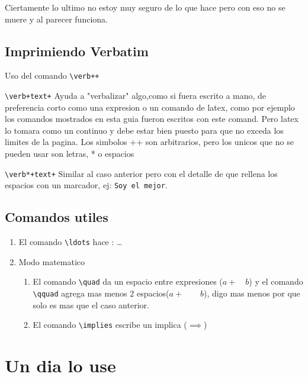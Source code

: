 \documentclass[letter,10pt]{article}
\begin{document}
Ciertamente lo ultimo no estoy muy seguro de lo que hace pero con eso no se muere y al parecer funciona.
\subsection{Imprimiendo Verbatim}
 
Uso del comando \verb|\verb++|
\begin{description}
\item{\verb|\verb+text+| } Ayuda a "verbalizar" algo,como si fuera escrito a mano, de preferencia corto como una expresion o un comando de latex, como por ejemplo los comandos mostrados en esta guia fueron escritos con este comand. Pero latex lo tomara como un continuo y debe estar bien puesto para que no exceda los limites de la pagina. Los simbolos ++ son arbitrarios, pero los unicos que no se pueden usar son letras, * o espacios
\item{\verb|\verb*+text+| } Similar al caso anterior pero con el detalle de que rellena los espacios con un marcador, ej: \verb*+Soy el mejor+.
\end{description}


\subsection{Comandos utiles}

\begin{enumerate}

\item El comando \verb|\ldots| hace :  \ldots

\item Modo matematico
\begin{enumerate}
\item El comando \verb|\quad| da un espacio entre expresiones ($a+ \quad b$) y el comando \verb|\qquad| agrega mas menos 2 espacios($a+ \qquad b$), digo mas menos por que solo es mas que el caso anterior.

\item El comando \verb+\implies+ escribe un implica ($\implies$) 


\end{enumerate}


\end{enumerate}

\section{Un dia lo use}
\end{document}
